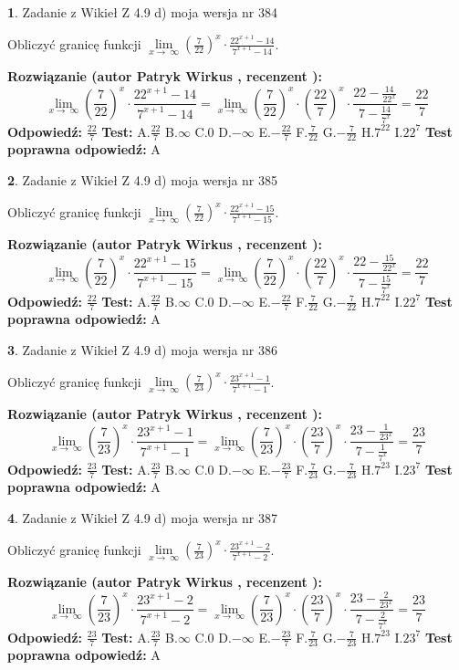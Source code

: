 \documentclass[12pt, a4paper]{article}
\theoremstyle{definition} %
\newtheorem{zad}{}
\newcommand{\zadStart}[1]{\begin{zad}#1\newline}
\newcommand{\zadStop}{\end{zad}}
\newcommand{\rozwStart}[2]{\noindent \textbf{Rozwiązanie (autor #1 , recenzent #2): }\newline}
\newcommand{\rozwStop}{\newline}
\newcommand{\odpStart}{\noindent \textbf{Odpowiedź:}\newline}
\newcommand{\odpStop}{\newline}
\newcommand{\testStart}{\noindent \textbf{Test:}\newline}
\newcommand{\testStop}{\newline}
\newcommand{\kluczStart}{\noindent \textbf{Test poprawna odpowiedź:}\newline}
\newcommand{\kluczStop}{\newline}
\begin{document}
\zadStart{Zadanie z Wikieł Z 4.9 d) moja wersja nr 384}


Obliczyć granicę funkcji  $\lim\limits_{x\to\ \infty}(\frac{7}{22})^{x}\cdot\frac{22^{x+1}-14}{7^{x+1}-14}$.
\zadStop
\rozwStart{Patryk Wirkus}{}
$$\lim\limits_{x\to\ \infty}(\frac{7}{22})^{x}\cdot\frac{22^{x+1}-14}{7^{x+1}-14}=\lim\limits_{x\to\ \infty}(\frac{7}{22})^{x}\cdot(\frac{22}{7})^{x} \cdot \frac{22-\frac{14}{22^{x}}}{7-\frac{14}{7^{x}}} = \frac{22}{7}$$
\rozwStop
\odpStart
$\frac{22}{7}$
\odpStop
\testStart
A.$\frac{22}{7}$ B.$\infty$ C.$0$ D.$-\infty$ E.$-\frac{22}{7}$
F.$\frac{7}{22}$ G.$-\frac{7}{22}$
H.$7^{22}$
I.$22^{7}$
\testStop
\kluczStart
A
\kluczStop



\zadStart{Zadanie z Wikieł Z 4.9 d) moja wersja nr 385}


Obliczyć granicę funkcji  $\lim\limits_{x\to\ \infty}(\frac{7}{22})^{x}\cdot\frac{22^{x+1}-15}{7^{x+1}-15}$.
\zadStop
\rozwStart{Patryk Wirkus}{}
$$\lim\limits_{x\to\ \infty}(\frac{7}{22})^{x}\cdot\frac{22^{x+1}-15}{7^{x+1}-15}=\lim\limits_{x\to\ \infty}(\frac{7}{22})^{x}\cdot(\frac{22}{7})^{x} \cdot \frac{22-\frac{15}{22^{x}}}{7-\frac{15}{7^{x}}} = \frac{22}{7}$$
\rozwStop
\odpStart
$\frac{22}{7}$
\odpStop
\testStart
A.$\frac{22}{7}$ B.$\infty$ C.$0$ D.$-\infty$ E.$-\frac{22}{7}$
F.$\frac{7}{22}$ G.$-\frac{7}{22}$
H.$7^{22}$
I.$22^{7}$
\testStop
\kluczStart
A
\kluczStop



\zadStart{Zadanie z Wikieł Z 4.9 d) moja wersja nr 386}


Obliczyć granicę funkcji  $\lim\limits_{x\to\ \infty}(\frac{7}{23})^{x}\cdot\frac{23^{x+1}-1}{7^{x+1}-1}$.
\zadStop
\rozwStart{Patryk Wirkus}{}
$$\lim\limits_{x\to\ \infty}(\frac{7}{23})^{x}\cdot\frac{23^{x+1}-1}{7^{x+1}-1}=\lim\limits_{x\to\ \infty}(\frac{7}{23})^{x}\cdot(\frac{23}{7})^{x} \cdot \frac{23-\frac{1}{23^{x}}}{7-\frac{1}{7^{x}}} = \frac{23}{7}$$
\rozwStop
\odpStart
$\frac{23}{7}$
\odpStop
\testStart
A.$\frac{23}{7}$ B.$\infty$ C.$0$ D.$-\infty$ E.$-\frac{23}{7}$
F.$\frac{7}{23}$ G.$-\frac{7}{23}$
H.$7^{23}$
I.$23^{7}$
\testStop
\kluczStart
A
\kluczStop



\zadStart{Zadanie z Wikieł Z 4.9 d) moja wersja nr 387}


Obliczyć granicę funkcji  $\lim\limits_{x\to\ \infty}(\frac{7}{23})^{x}\cdot\frac{23^{x+1}-2}{7^{x+1}-2}$.
\zadStop
\rozwStart{Patryk Wirkus}{}
$$\lim\limits_{x\to\ \infty}(\frac{7}{23})^{x}\cdot\frac{23^{x+1}-2}{7^{x+1}-2}=\lim\limits_{x\to\ \infty}(\frac{7}{23})^{x}\cdot(\frac{23}{7})^{x} \cdot \frac{23-\frac{2}{23^{x}}}{7-\frac{2}{7^{x}}} = \frac{23}{7}$$
\rozwStop
\odpStart
$\frac{23}{7}$
\odpStop
\testStart
A.$\frac{23}{7}$ B.$\infty$ C.$0$ D.$-\infty$ E.$-\frac{23}{7}$
F.$\frac{7}{23}$ G.$-\frac{7}{23}$
H.$7^{23}$
I.$23^{7}$
\testStop
\kluczStart
A
\kluczStop
\end{document}
